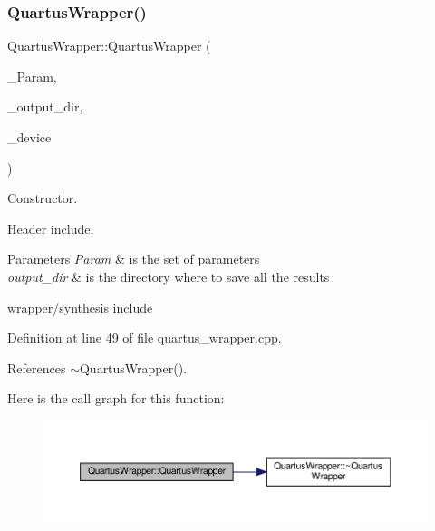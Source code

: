 \subsubsection{\texorpdfstring{Quartus\+Wrapper()}{QuartusWrapper()}}
{\footnotesize\ttfamily Quartus\+Wrapper\+::\+Quartus\+Wrapper (\begin{DoxyParamCaption}\item[{const \hyperlink{Parameter_8hpp_a37841774a6fcb479b597fdf8955eb4ea}{Parameter\+Const\+Ref} \&}]{\+\_\+\+Param,  }\item[{const std\+::string \&}]{\+\_\+output\+\_\+dir,  }\item[{const \hyperlink{target__device_8hpp_acedb2b7a617e27e6354a8049fee44eda}{target\+\_\+device\+Ref} \&}]{\+\_\+device }\end{DoxyParamCaption})}



Constructor. 

Header include.


\begin{DoxyParams}{Parameters}
{\em Param} & is the set of parameters \\
\hline
{\em output\+\_\+dir} & is the directory where to save all the results\\
\hline
\end{DoxyParams}
wrapper/synthesis include 

Definition at line 49 of file quartus\+\_\+wrapper.\+cpp.



References $\sim$\+Quartus\+Wrapper().

Here is the call graph for this function\+:
\nopagebreak
\begin{figure}[H]
\begin{center}
\leavevmode
\includegraphics[width=350pt]{db/d46/classQuartusWrapper_a00e71f3b3eea518b01b07e12827095ca_cgraph}
\end{center}
\end{figure}
\mbox{\label{classQuartusWrapper_a9cff8b46a6974dd95dc9776f8428ebd7}} 
